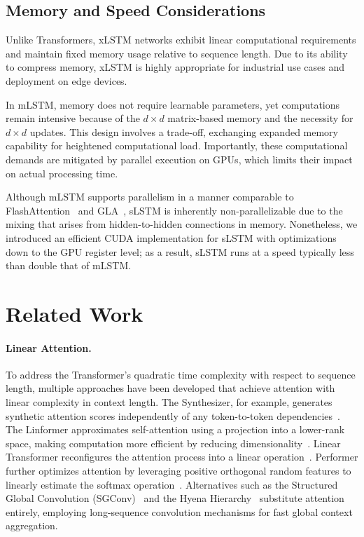 \subsection{Memory and Speed Considerations}

Unlike Transformers, xLSTM networks exhibit linear computational requirements and maintain fixed memory usage relative to sequence length. Due to its ability to compress memory, xLSTM is highly appropriate for industrial use cases and deployment on edge devices.

In mLSTM, memory does not require learnable parameters, yet computations remain intensive because of the $d \times d$ matrix-based memory and the necessity for $d \times d$ updates. This design involves a trade-off, exchanging expanded memory capability for heightened computational load. Importantly, these computational demands are mitigated by parallel execution on GPUs, which limits their impact on actual processing time.

Although mLSTM supports parallelism in a manner comparable to FlashAttention~\citep{Dao:22,Dao:23} and GLA~\citep{Yang:23arxiv}, sLSTM is inherently non-parallelizable due to the mixing that arises from hidden-to-hidden connections in memory. Nonetheless, we introduced an efficient CUDA implementation for sLSTM with optimizations down to the GPU register level; as a result, sLSTM runs at a speed typically less than double that of mLSTM.

\section{Related Work}
\label{sec:related}

\paragraph{Linear Attention.} To address the Transformer’s quadratic time complexity with respect to sequence length, multiple approaches have been developed that achieve attention with linear complexity in context length. The Synthesizer, for example, generates synthetic attention scores independently of any token-to-token dependencies~\citep{Tay:20arxiv}. The Linformer approximates self-attention using a projection into a lower-rank space, making computation more efficient by reducing dimensionality~\citep{Wang:20arxiv}. Linear Transformer reconfigures the attention process into a linear operation~\citep{Katharopoulos:20}. Performer further optimizes attention by leveraging positive orthogonal random features to linearly estimate the softmax operation~\citep{Choromanski:21}. Alternatives such as the Structured Global Convolution (SGConv)~\citep{Li:22} and the Hyena Hierarchy~\citep{Poli:23} substitute attention entirely, employing long-sequence convolution mechanisms for fast global context aggregation.

